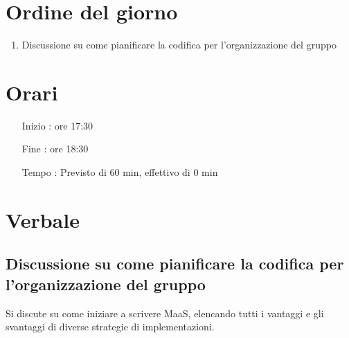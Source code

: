 \documentclass[11pt]{meetingmins}
\begin{document}
\maketitle

\section{Ordine del giorno}

\begin{enumerate}

  \item Discussione su come pianificare la codifica per l'organizzazione del gruppo

\end{enumerate}

\section{Orari}

\begin{itemize}
\item[Inizio]: ore 17:30
\item[Fine]: ore 18:30
\item[Tempo]: Previsto di 60 min, effettivo di 0 min

\end{itemize}

\section{Verbale}

\subsection{Discussione su come pianificare la codifica per l'organizzazione del gruppo}

Si discute su come iniziare a scrivere MaaS, elencando tutti i vantaggi e gli svantaggi di diverse strategie di implementazioni.

\end{document}
